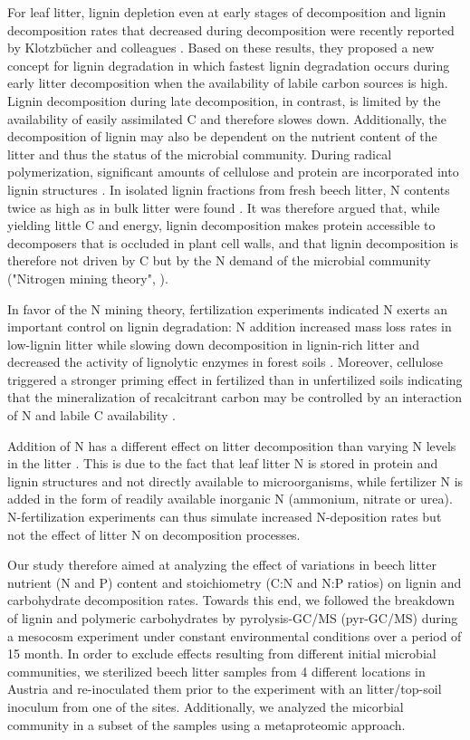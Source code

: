 For leaf litter, lignin depletion even at early stages of decomposition and lignin decomposition rates that decreased during decomposition were recently reported by Klotzb\"{u}cher and colleagues \cite{Klotzbucher2011}. Based on these results, they proposed a new concept for lignin degradation in which fastest lignin degradation occurs during early litter decomposition when the availability of labile carbon sources is high. Lignin decomposition during late decomposition, in contrast, is limited by the availability of easily assimilated C and therefore slowes down. Additionally, the decomposition of lignin may also be dependent on the nutrient content of the litter and thus the status of the microbial community. During radical polymerization, significant amounts of cellulose and protein are incorporated into lignin structures \cite{Achyuthan2010}. In isolated lignin fractions from fresh beech litter, N contents twice as high as in bulk litter were found \cite{Dyckmans2002}. It was therefore argued that, while yielding little C and energy, lignin decomposition makes protein accessible to decomposers that is occluded in plant cell walls, and that lignin decomposition is therefore not driven by C but by the N demand of the microbial community ("Nitrogen mining theory", \cite{Craine2007}). 

In favor of the N mining theory, fertilization experiments indicated N exerts an important control on lignin degradation: N addition increased mass loss rates in low-lignin litter while slowing down decomposition in lignin-rich litter \cite{Knorr2005} and decreased the activity of lignolytic enzymes in forest soils \cite{Sinsabaugh2010}. Moreover, cellulose triggered a stronger priming effect in fertilized than in unfertilized soils indicating that the mineralization of recalcitrant carbon may be controlled by an interaction of N and labile C availability \cite{Fontaine2011}.

Addition of N has a different effect on litter decomposition than varying N levels in the litter \cite{Talbot2011}. This is due to the fact that leaf litter N is stored in protein and lignin structures and not directly available to microorganisms, while fertilizer N is added in the form of readily available inorganic N (ammonium, nitrate or urea). N-fertilization experiments can thus simulate increased N-deposition rates but not the effect of litter N on decomposition processes.

Our study therefore aimed at analyzing the effect of variations in beech litter nutrient (N and P) content and stoichiometry (C:N and N:P ratios) on lignin and carbohydrate decomposition rates. Towards this end, we followed the breakdown of lignin and polymeric carbohydrates by pyrolysis-GC/MS (pyr-GC/MS) during a mesocosm experiment under constant environmental conditions over a period of 15 month. In order to exclude effects resulting from different initial microbial communities, we sterilized beech litter samples from 4 different locations in Austria and re-inoculated them prior to the experiment with an litter/top-soil inoculum from one of the sites.  
Additionally, we analyzed the micorbial community in a subset of the samples using a metaproteomic approach.

